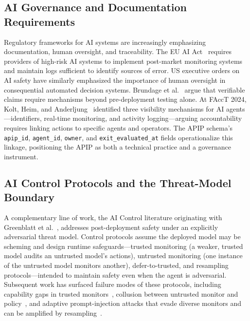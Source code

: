 \documentclass[conference]{IEEEtran}
\begin{document}
\subsection{AI Governance and Documentation Requirements}
\label{subsec:governance}

Regulatory frameworks for AI systems are increasingly emphasizing
documentation, human oversight, and traceability. The EU AI
Act~\cite{eu2024aiact} requires providers of high-risk AI systems to implement
post-market monitoring systems and maintain logs sufficient to identify sources
of error. US executive orders on AI safety have similarly emphasized the
importance of human oversight in consequential automated decision systems.
Brundage et al.~\cite{brundage2020trustworthy} argue that verifiable claims
require mechanisms beyond pre-deployment testing alone. At FAccT 2024, Kolt,
Heim, and Anderljung~\cite{kolt2024visibility} identified three visibility
mechanisms for AI agents---identifiers, real-time monitoring, and activity
logging---arguing accountability requires linking actions to specific agents and
operators. The APIP schema's \texttt{apip\_id}, \texttt{agent\_id},
\texttt{owner}, and \texttt{exit\_evaluated\_at} fields operationalize this
linkage, positioning the APIP as both a technical practice and a governance
instrument.

\subsection{AI Control Protocols and the Threat-Model Boundary}
\label{subsec:ai-control}

A complementary line of work, the AI Control literature originating with
Greenblatt et al.~\cite{greenblatt2023control}, addresses post-deployment
safety under an explicitly adversarial threat model. Control protocols assume
the deployed model may be scheming and design runtime safeguards---trusted
monitoring (a weaker, trusted model audits an untrusted model's actions),
untrusted monitoring (one instance of the untrusted model monitors another),
defer-to-trusted, and resampling protocols---intended to maintain safety even
when the agent is adversarial. Subsequent work has surfaced failure modes of
these protocols, including capability gaps in trusted
monitors~\cite{bhatt2025ctrlz}, collusion between untrusted monitor and
policy~\cite{mallen2025subversion}, and adaptive prompt-injection attacks that
evade diverse monitors and can be amplified by
resampling~\cite{schoen2025stress}.
\end{document}

